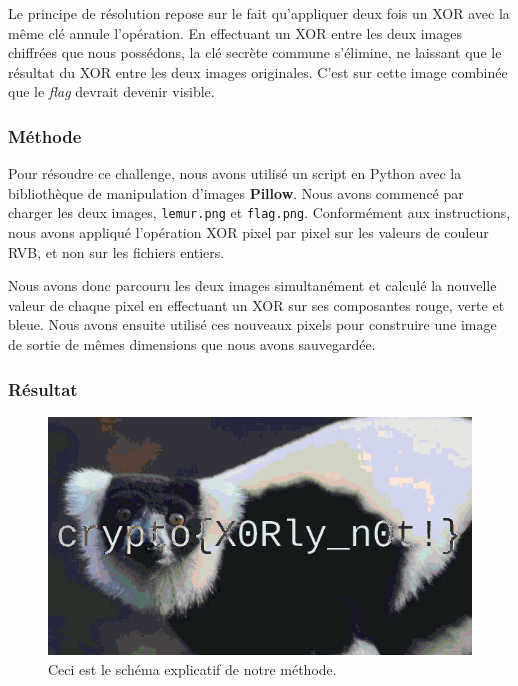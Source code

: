 \documentclass[12pt, a4paper]{article}
\begin{document}
        Le principe de résolution repose sur le fait qu'appliquer deux fois un XOR avec la même clé annule l'opération. En effectuant un XOR entre les deux images chiffrées que nous possédons, la clé secrète commune s'élimine, ne laissant que le résultat du XOR entre les deux images originales. C'est sur cette image combinée que le \textit{flag} devrait devenir visible.
        
        \subsubsection{Méthode}
        
        Pour résoudre ce challenge, nous avons utilisé un script en Python avec la bibliothèque de manipulation d'images \textbf{Pillow}. Nous avons commencé par charger les deux images, \texttt{lemur.png} et \texttt{flag.png}. Conformément aux instructions, nous avons appliqué l'opération XOR pixel par pixel sur les valeurs de couleur RVB, et non sur les fichiers entiers.
        
        Nous avons donc parcouru les deux images simultanément et calculé la nouvelle valeur de chaque pixel en effectuant un XOR sur ses composantes rouge, verte et bleue. Nous avons ensuite utilisé ces nouveaux pixels pour construire une image de sortie de mêmes dimensions que nous avons sauvegardée.
        
        \subsubsection{Résultat}
        
            \begin{figure}[H]
                \centering
                \includegraphics[width=0.8\linewidth]{Images/Lemur/xored_result.png}
                
                \caption{Ceci est le schéma explicatif de notre méthode.}
                
                \label{fig:encodeChallRes}
            \end{figure}
\end{document}

